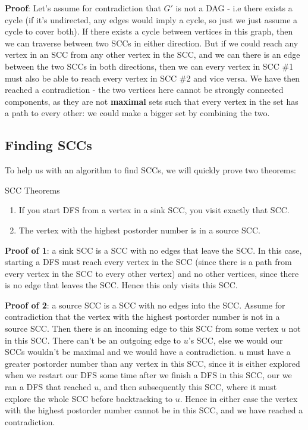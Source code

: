 \documentclass{article}
\begin{document}
\textbf{Proof}: Let's assume for contradiction that $G'$ is not a DAG - i.e there exists a cycle (if it's undirected, any edges would imply a cycle, so just we just assume a cycle to cover both). If there exists a cycle between vertices in this graph, then we can traverse between two SCCs in either direction. But if we could reach any vertex in an SCC from any other vertex in the SCC, and we can there is an edge between the two SCCs in both directions, then we can every vertex in SCC \#1 must also be able to reach every vertex in SCC \#2 and vice versa. We have then reached a contradiction - the two vertices here cannot be strongly connected components, as they are not \textbf{maximal} sets such that every vertex in the set has a path to every other: we could make a bigger set by combining the two.

\subsection{Finding SCCs}

To help us with an algorithm to find SCCs, we will quickly prove two theorems:

\begin{theorem}{SCC Theorems}
\begin{enumerate}
    \item If you start DFS from a vertex in a sink SCC, you visit exactly that SCC.
    \item The vertex with the highest postorder number is in a source SCC.
\end{enumerate}
\end{theorem}

\textbf{Proof of 1}: a sink SCC is a SCC with no edges that leave the SCC. In this case, starting a DFS must reach every vertex in the SCC (since there is a path from every vertex in the SCC to every other vertex) and no other vertices, since there is no edge that leaves the SCC. Hence this only visits this SCC.

\textbf{Proof of 2}: a source SCC is a SCC with no edges into the SCC. Assume for contradiction that the vertex with the highest postorder number is not in a source SCC. Then there is an incoming edge to this SCC from some vertex $u$ not in this SCC. There can't be an outgoing edge to $u$'s SCC, else we would our SCCs wouldn't be maximal and we would have a contradiction. $u$ must have a greater postorder number than any vertex in this SCC, since it is either explored when we restart our DFS some time after we finish a DFS in this SCC, our we ran a DFS that reached $u$, and then subsequently this SCC, where it must explore the whole SCC before backtracking to $u$. Hence in either case the vertex with the highest postorder number cannot be in this SCC, and we have reached a contradiction.
\end{document}
